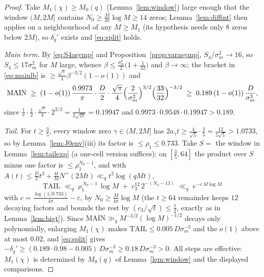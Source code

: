 \begin{proof}
Take $M_1(\chi)\ge M_0(q)$ (Lemma~\ref{lem:window}) large enough that
the window $(M,2M]$ contains $N_0\ge\tfrac M{4\pi}\log M\ge14$ zeros;
Lemma~\ref{lem:diffint} then applies on a neighbourhood of any
$M\ge M_1$ (its hypothesis needs only $8$ zeros below $2M$), so
$\delta_q'$ exists and \eqref{eq:split} holds.

\emph{Main term.} By \eqref{eq:S4asymp} and
Proposition~\ref{prop:varasymp}, $S_4/\sigma_m^2\to16$, so
$S_4\le17\sigma_m^2$ for $M$ large, whence
$\beta\le\tfrac{\sigma_m^2}2\bigl(1+\tfrac1{32}\bigr)$ and
$\beta\to\infty$; the bracket in \eqref{eq:mainlb} is
$\ge\tfrac{\sqrt\pi}{4}\beta^{-3/2}(1-o(1))$ and
\[
\mathrm{MAIN}\;\ge\;(1-o(1))\,
\frac{0.9973}{\pi}\cdot\frac D2\cdot\frac{\sqrt\pi}4
\Bigl(\frac2{\sigma_m^2}\Bigr)^{3/2}
\Bigl(\frac{33}{32}\Bigr)^{-3/2}
\;\ge\;0.189\,(1-o(1))\,\frac D{\sigma_m^3},
\]
since $\frac1\pi\cdot\frac12\cdot\frac{\sqrt\pi}4\cdot2^{3/2}
=\frac1{2\sqrt{2\pi}}=0.19947$ and
$0.9973\cdot0.9548\cdot0.19947>0.189$.

\emph{Tail.} For $t\ge\tfrac35$, every window zero
$\gamma\in(M,2M]$ has $2a_\gamma t\ge\tfrac4{\sqrt5}\cdot\tfrac35
=\tfrac{12}{5\sqrt5}>1.0733$, so by Lemma~\ref{lem:J0env}(iii) its
factor is $\le\rho_1\le0.733$. Take $S=$ the window in
Lemma~\ref{lem:tailexp} (a one-cell version suffices): on
$[\tfrac35,64]$ the product over $S$ minus one factor is
$\le\rho_1^{N_0-1}$, and with
$A(t)\le\tfrac D2t^2+\tfrac{4t}MN^+(2Mt)\ll_q t^2\log(qMt)$,
\[
\mathrm{TAIL}\;\ll_q\;\rho_1^{\,N_0-1}\,\log M
\;+\;c_3^{12}\,2^{-(N_0-13)}
\;\ll_q\;e^{-c\,M\log M}
\]
with $c=\tfrac{\log(1/0.733)}{4\pi}-\varepsilon$, by
$N_0\ge\tfrac M{4\pi}\log M$ (the $t\ge64$ remainder keeps $12$
decaying factors and bounds the rest by
$(c_3/\sqrt t)\le\tfrac12$, exactly as in Lemma~\ref{lem:bigt}).
Since $\mathrm{MAIN}\gg_q M^{-3/2}(\log M)^{-1/2}$ decays only
polynomially, enlarging $M_1(\chi)$ makes
$\mathrm{TAIL}\le0.005\,D\sigma_m^{-3}$ and the $o(1)$ above at most
$0.02$, and \eqref{eq:split} gives
$-\delta_q'\ge(0.189\cdot0.98-0.005)\,D\sigma_m^{-3}
\ge0.18\,D\sigma_m^{-3}>0$. All steps are effective: $M_1(\chi)$ is
determined by $M_0(q)$ of Lemma~\ref{lem:window} and the displayed
comparisons.


\end{proof}
